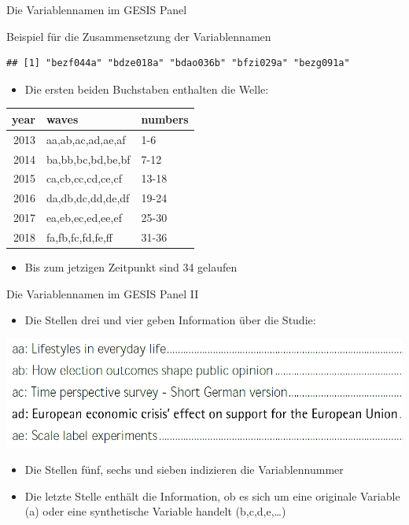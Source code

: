 \documentclass[ignorenonframetext,]{beamer}
\providecommand{\tightlist}{%
  \setlength{\itemsep}{0pt}\setlength{\parskip}{0pt}}
\begin{document}
\begin{frame}[fragile]{Die Variablennamen im GESIS Panel}

\begin{block}{Beispiel für die Zusammensetzung der Variablennamen}

\begin{verbatim}
## [1] "bezf044a" "bdze018a" "bdao036b" "bfzi029a" "bezg091a"
\end{verbatim}

\begin{itemize}
\tightlist
\item
  Die ersten beiden Buchstaben enthalten die Welle:
\end{itemize}

\begin{longtable}[]{@{}rll@{}}
\toprule
year & waves & numbers\tabularnewline
\midrule
\endhead
2013 & aa,ab,ac,ad,ae,af & 1-6\tabularnewline
2014 & ba,bb,bc,bd,be,bf & 7-12\tabularnewline
2015 & ca,cb,cc,cd,ce,cf & 13-18\tabularnewline
2016 & da,db,dc,dd,de,df & 19-24\tabularnewline
2017 & ea,eb,ec,ed,ee,ef & 25-30\tabularnewline
2018 & fa,fb,fc,fd,fe,ff & 31-36\tabularnewline
\bottomrule
\end{longtable}

\begin{itemize}
\tightlist
\item
  Bis zum jetzigen Zeitpunkt sind 34 gelaufen
\end{itemize}

\end{block}

\end{frame}

\begin{frame}{Die Variablennamen im GESIS Panel II}

\begin{itemize}
\tightlist
\item
  Die Stellen drei und vier geben Information über die Studie:
\end{itemize}

\includegraphics{figure/examplestudies.PNG}

\begin{itemize}
\item
  Die Stellen fünf, sechs und sieben indizieren die Variablennummer
\item
  Die letzte Stelle enthält die Information, ob es sich um eine
  originale Variable (a) oder eine synthetische Variable handelt
  (b,c,d,e,\ldots{})
\end{itemize}

\end{frame}
\end{document}
